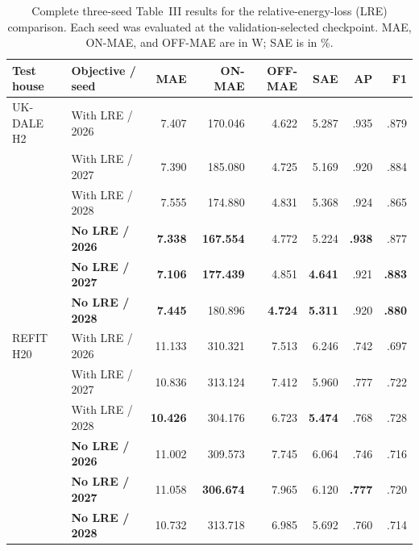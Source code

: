 \documentclass[conference]{IEEEtran}
\newcommand{\selected}[1]{\textbf{#1}}
\begin{document}
\begin{table}[!t]
\caption{Complete three-seed Table~III results for the relative-energy-loss (LRE) comparison.  Each seed was evaluated at the validation-selected checkpoint.  MAE, ON-MAE, and OFF-MAE are in W; SAE is in \%.}
\label{tab:appendix-lre-seeds}
\centering\scriptsize
\begin{tabular}{llrrrrrr}
\toprule
Test house & Objective / seed & MAE & ON-MAE & OFF-MAE & SAE & AP & F1 \\
\midrule
UK-DALE H2 & With LRE / 2026 & 7.407 & 170.046 & 4.622 & 5.287 & .935 & .879 \\
& With LRE / 2027 & 7.390 & 185.080 & 4.725 & 5.169 & .920 & .884 \\
& With LRE / 2028 & 7.555 & 174.880 & 4.831 & 5.368 & .924 & .865 \\
& \selected{No LRE / 2026} & \selected{7.338} & \selected{167.554} & 4.772 & 5.224 & \selected{.938} & .877 \\
& \selected{No LRE / 2027} & \selected{7.106} & \selected{177.439} & 4.851 & \selected{4.641} & .921 & \selected{.883} \\
& \selected{No LRE / 2028} & \selected{7.445} & 180.896 & \selected{4.724} & \selected{5.311} & .920 & \selected{.880} \\
\midrule
REFIT H20 & With LRE / 2026 & 11.133 & 310.321 & 7.513 & 6.246 & .742 & .697 \\
& With LRE / 2027 & 10.836 & 313.124 & 7.412 & 5.960 & .777 & .722 \\
& With LRE / 2028 & \selected{10.426} & 304.176 & 6.723 & \selected{5.474} & .768 & .728 \\
& \selected{No LRE / 2026} & 11.002 & 309.573 & 7.745 & 6.064 & .746 & .716 \\
& \selected{No LRE / 2027} & 11.058 & \selected{306.674} & 7.965 & 6.120 & \selected{.777} & .720 \\
& \selected{No LRE / 2028} & 10.732 & 313.718 & 6.985 & 5.692 & .760 & .714 \\
\bottomrule
\end{tabular}
\end{table}
\end{document}
